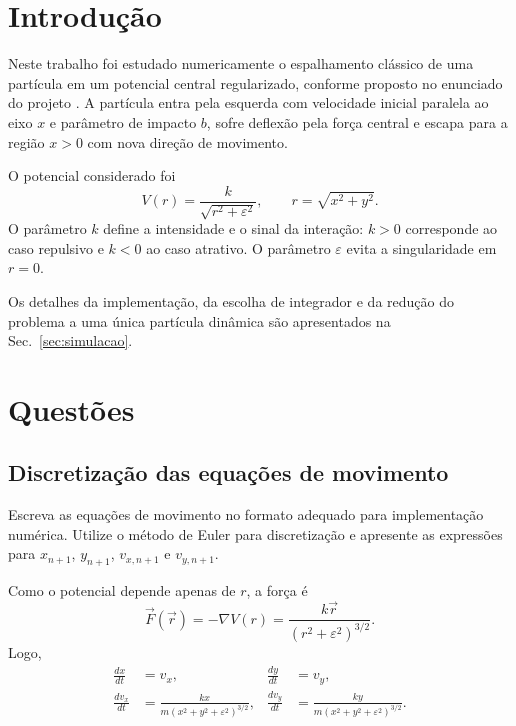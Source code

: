 \section{Introdu\c{c}\~ao}

Neste trabalho foi estudado numericamente o espalhamento cl\'assico de uma part\'icula em um potencial central regularizado, conforme proposto no enunciado do projeto \cite{projeto-3-enunciado-2026}. A part\'icula entra pela esquerda com velocidade inicial paralela ao eixo $x$ e par\^ametro de impacto $b$, sofre deflex\~ao pela for\c{c}a central e escapa para a regi\~ao $x>0$ com nova dire\c{c}\~ao de movimento.

O potencial considerado foi
\begin{equation}
    V(r)=\frac{k}{\sqrt{r^2+\varepsilon^2}},
    \qquad
    r=\sqrt{x^2+y^2}.
    \label{eq:potencial}
\end{equation}
O par\^ametro $k$ define a intensidade e o sinal da intera\c{c}\~ao: $k>0$ corresponde ao caso repulsivo e $k<0$ ao caso atrativo. O par\^ametro $\varepsilon$ evita a singularidade em $r=0$.

Os detalhes da implementa\c{c}\~ao, da escolha de integrador e da redu\c{c}\~ao do problema a uma \'unica part\'icula din\^amica s\~ao apresentados na Sec.~\ref{sec:simulacao}.



\section{Quest\~oes}

\subsection{Discretiza\c{c}\~ao das equa\c{c}\~oes de movimento}

\begin{questao}
Escreva as equa\c{c}\~oes de movimento no formato adequado para implementa\c{c}\~ao num\'erica. Utilize o m\'etodo de Euler para discretiza\c{c}\~ao e apresente as express\~oes para $x_{n+1}$, $y_{n+1}$, $v_{x,n+1}$ e $v_{y,n+1}$.
\end{questao}

Como o potencial depende apenas de $r$, a for\c{c}a \'e
\begin{equation}
    \vec F(\vec r)=-\nabla V(r)
    =
    \frac{k\vec r}{(r^2+\varepsilon^2)^{3/2}}.
    \label{eq:forca}
\end{equation}
Logo,
\begin{align}
    \frac{dx}{dt} &= v_x, &
    \frac{dy}{dt} &= v_y, \\
    \frac{dv_x}{dt} &= \frac{kx}{m(x^2+y^2+\varepsilon^2)^{3/2}}, &
    \frac{dv_y}{dt} &= \frac{ky}{m(x^2+y^2+\varepsilon^2)^{3/2}}.
\end{align}

